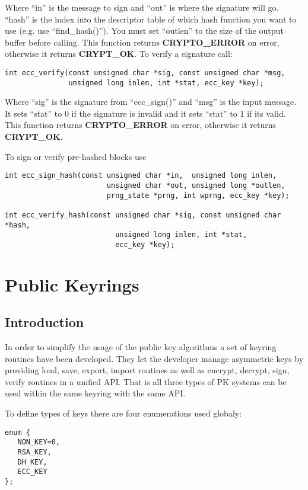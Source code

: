 \documentclass{book}
\begin{document}
Where ``in'' is the message to sign and ``out'' is where the signature will go.  ``hash'' is the index into the descriptor
table of which hash function you want to use (e.g. use ``find\_hash()'').  You must set ``outlen'' to the size of the 
output buffer before calling.  This function returns {\bf CRYPTO\_ERROR} on error, otherwise it returns {\bf CRYPT\_OK}.  To
verify a signature call:
\begin{verbatim}
int ecc_verify(const unsigned char *sig, const unsigned char *msg, 
               unsigned long inlen, int *stat, ecc_key *key);
\end{verbatim}
Where ``sig'' is the signature from ``ecc\_sign()'' and ``msg'' is the input message.  It sets ``stat'' to 0 if the signature
is invalid and it sets ``stat'' to 1 if its valid.  This function returns {\bf CRYPTO\_ERROR} on error, otherwise it returns {\bf CRYPT\_OK}.

To sign or verify pre-hashed blocks use
\begin{verbatim}
int ecc_sign_hash(const unsigned char *in,  unsigned long inlen,
                        unsigned char *out, unsigned long *outlen,
                        prng_state *prng, int wprng, ecc_key *key);

int ecc_verify_hash(const unsigned char *sig, const unsigned char *hash, 
                          unsigned long inlen, int *stat, 
                          ecc_key *key);
\end{verbatim}

\chapter{Public Keyrings}
\section{Introduction}
In order to simplify the usage of the public key algorithms a set of keyring routines have been developed.  They let the 
developer manage asymmetric keys by providing load, save, export, import routines as well as encrypt, decrypt, sign, verify
routines in a unified API.  That is all three types of PK systems can be used within the same keyring with the same API.

To define types of keys there are four enumerations used globaly:
\begin{verbatim}
enum {
   NON_KEY=0,
   RSA_KEY,
   DH_KEY,
   ECC_KEY
};
\end{verbatim}
\end{document}
